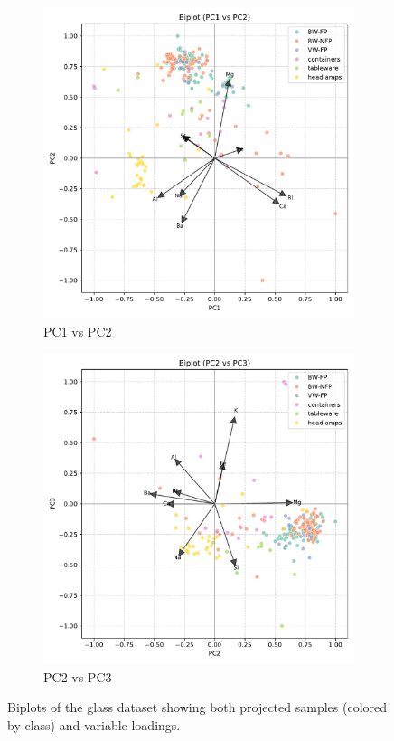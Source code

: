 \documentclass[dtu]{dtuarticle}
\begin{document}
	\begin{figure}
		\centering
		\begin{subfigure}{0.49\textwidth}
			\includegraphics[width=\linewidth]{figures/pca_biplot_pc1_pc2.pdf}
			\caption{PC1 vs PC2}
			\label{fig:biplot_pc1_pc2}
		\end{subfigure}
		\hfill
		\begin{subfigure}{0.49\textwidth}
			\includegraphics[width=\linewidth]{figures/pca_biplot_pc2_pc3.pdf}
			\caption{PC2 vs PC3}
			\label{fig:biplot_pc1_pc3}
		\end{subfigure}
		\caption{Biplots of the glass dataset showing both projected samples (colored by class) and variable loadings.}
		\label{fig:biplots}
	\end{figure}
\end{document}
